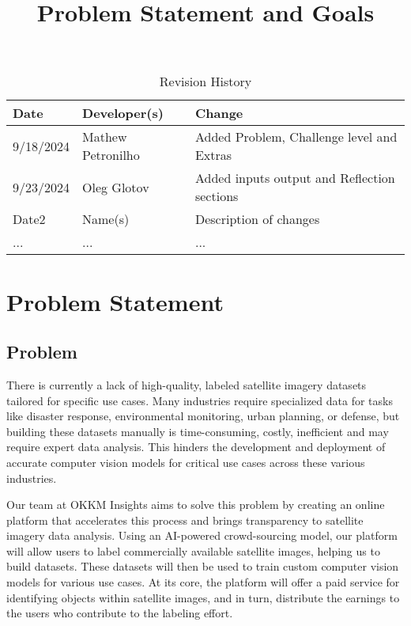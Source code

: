 \documentclass{article}
\title{Problem Statement and Goals\\\progname}
\author{\authname}
\date{}
\begin{document}
\maketitle

\begin{table}[hp]
\caption{Revision History} \label{TblRevisionHistory}
\begin{tabularx}{\textwidth}{llX}
\toprule
\textbf{Date} & \textbf{Developer(s)} & \textbf{Change}\\
\midrule
9/18/2024 & Mathew Petronilho & Added Problem, Challenge level and Extras\\
9/23/2024 & Oleg Glotov & Added inputs output and Reflection sections\\

Date2 & Name(s) & Description of changes\\
... & ... & ...\\
\bottomrule
\end{tabularx}
\end{table}

\section{Problem Statement}



\subsection{Problem}
There is currently a lack of high-quality, labeled satellite imagery datasets tailored for specific use cases. Many industries require specialized data for tasks like disaster 
response, environmental monitoring, urban planning, or defense, but building these datasets manually is time-consuming, costly, inefficient and may require expert data analysis. 
This hinders the development and deployment of accurate computer vision models for critical use cases across these various industries.

Our team at OKKM Insights aims to solve this problem by creating an online platform that accelerates this process and brings transparency to satellite imagery data analysis. 
Using an AI-powered crowd-sourcing model, our platform will allow users to label commercially available satellite images, helping us to build datasets. These datasets will then 
be used to train custom computer vision models for various use cases. At its core, the platform will offer a paid service for identifying objects within satellite images, 
and in turn, distribute the earnings to the users who contribute to the labeling effort.
\end{document}
